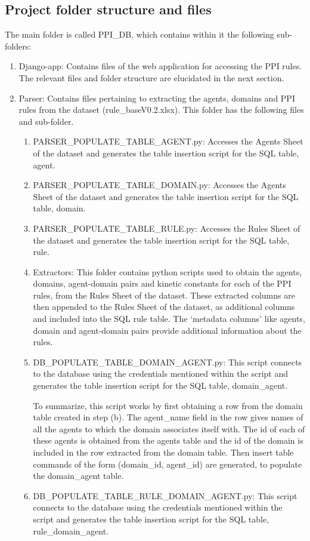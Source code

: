 \documentclass[msc,deptreport,ai]{infthesis}      %
\begin{document}
\subsection{Project folder structure and files}
The main folder is called PPI\_DB, which contains within it the following sub-folders:
 \begin{enumerate}
 	\item Django-app: Contains files of the web application for accessing the PPI rules. The relevant files and folder structure are elucidated in the next section.
 	\item Parser: Contains files pertaining to extracting the agents, domains and PPI rules from the dataset (rule\_baseV0.2.xlsx). This folder has the following files and sub-folder.
 	\begin{enumerate}
 		\item PARSER\_POPULATE\_TABLE\_AGENT.py: Accesses the Agents Sheet of the dataset and generates the table insertion script for the  SQL table, agent.
 		\item PARSER\_POPULATE\_TABLE\_DOMAIN.py: Accesses the Agents Sheet of the dataset and generates the table insertion script for the SQL table, domain.
 		\item PARSER\_POPULATE\_TABLE\_RULE.py: Accesses the Rules Sheet of the dataset and generates the table insertion script for the SQL table, rule.
 		\item Extractors: This folder contains python scripts used to obtain the agents, domains, agent-domain pairs and kinetic constants for each of the PPI rules, from the Rules Sheet of the dataset. These extracted columns are then appended to the Rules Sheet of the dataset, as additional columns and included into the SQL rule table. The `metadata columns' like agents, domain and agent-domain pairs provide additional information about the rules.
 		\item DB\_POPULATE\_TABLE\_DOMAIN\_AGENT.py: This script connects to the database using the credentials mentioned within the script and generates the table insertion script for the SQL table, domain\_agent. 
 		
 		To summarize, this script works by first obtaining a row from the domain table created in step (b). The agent\_name field in the row gives names of all the agents to which the domain associates itself with. The id of each of these agents is obtained from the agents table and the id of the domain is included in the row extracted from the domain table. Then insert table commands of the form (domain\_id, agent\_id) are generated, to populate the domain\_agent table.
 		\item DB\_POPULATE\_TABLE\_RULE\_DOMAIN\_AGENT.py: This script connects to the database using the credentials mentioned within the script and generates the table insertion script for the SQL table, rule\_domain\_agent. 
 		

\end{enumerate}
\end{enumerate}
\end{document}

